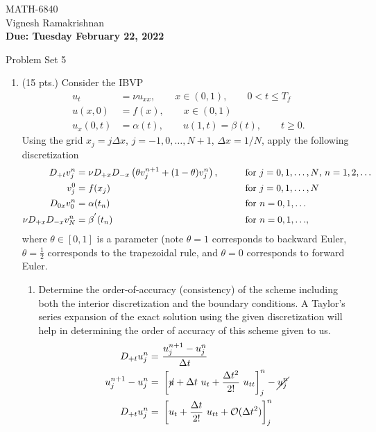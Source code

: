 \documentclass[11pt]{article}
\newcommand{\Dpt}{D_{+t}}
\newcommand{\Dpx}{D_{+x}}
\newcommand{\Dmx}{D_{-x}}
\newcommand{\Dzx}{D_{0x}}
\newcommand{\Oc}{\mathcal{O}}
\newcommand{\dx}{\Delta x}
\newcommand{\dt}{\Delta t}
\newcommand{\texp}[3]{\left[#1\right]^{#2}_{#3}}
\newcommand{\ut}{u_t}
\newcommand{\unj}{u^{n}_{j}}
\newcommand{\unpj}{u^{n+1}_{j}}
\begin{document}
\begin{flushright}
\small{MATH-6840\\
Vignesh Ramakrishnan\\
{\bf Due: Tuesday February 22, 2022}}
\end{flushright}

\begin{center}
\large{Problem Set 5}\\
\end{center}

\begin{enumerate}
  \item (15 pts.) {\color{red}Consider the IBVP}
    \begin{align*}
      u_t & = \nu u_{xx}, \qquad x\in(0,1), \qquad 0 < t \le T_f\\
      u(x,0) & = f(x), \qquad x\in(0,1)\\
      u_x(0,t) & = \alpha(t), \qquad u(1,t) = \beta(t), \qquad t\ge 0.
    \end{align*}
    {\color{red}Using the grid }$x_j=j\dx$, $j=-1,0,\ldots,N+1$, $\dx=1/N${\color{red}, apply the following discretization}
    \begin{align*}
      \Dpt v_j^n & = \nu\Dpx\Dmx \left(\theta v_j^{n+1}+(1-\theta)v_j^{n}\right), && \qquad \hbox{for $j=0,1,\ldots,N$, $n=1,2,\ldots$}\\
      v_j^0 & = f(x_j) && \qquad \hbox{for $j=0,1,\ldots,N $}\\
      \Dzx v_0^n & = \alpha(t_n) && \qquad \hbox{for $n=0,1,\ldots$}\\
      \nu\Dpx\Dmx v_N^n & = \beta^{'}(t_n) && \qquad \hbox{for $n=0,1,\ldots$},
    \end{align*}
    {\color{red}where} $\theta\in[0,1]${\color{red} is a parameter (note }$\theta=1${\color{red} corresponds to backward Euler, }$\theta=\frac{1}{2}${\color{red} corresponds to the trapezoidal rule, and $\theta=0$ corresponds to forward Euler. }
    
    \begin{enumerate}
      \item {\color{blue}Determine the order-of-accuracy (consistency) of the scheme including both the interior 	discretization and the boundary conditions. }
      A Taylor's series expansion of the exact solution using the given discretization will help in determining the order of accuracy of this scheme given to us. 
      \begin{align*}
      \Dpt \unj = & \  \frac{\unpj - \unj}{\dt} \\
      \unpj - \unj =& \ \texp{\cancel{u} + \dt \ \ut + \frac{\dt^2}{2!} \ u_{tt}}{n}{j} - \cancel{\unj} \\
      \Dpt \unj = & \ \texp{\ut + \frac{\dt}{2!} \ u_{tt} + \Oc(\dt^2) }{n}{j} 
      \end{align*}
      

\end{enumerate}
\end{enumerate}
\end{document}

